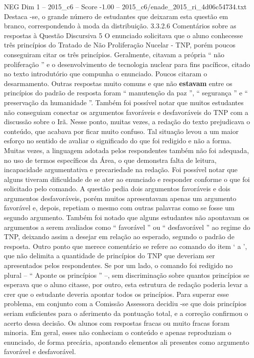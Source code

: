\begin{textsample}{NEG Dim 1 – 2015\_c6 – Score -1.00 – 2015\_c6/enade\_2015\_ri\_4d06c54734.txt}
Destaca -se, o grande número de estudantes que deixaram esta questão em branco, correspondendo à moda da distribuição. 3.3.2.6 Comentários sobre as respostas à Questão Discursiva 5 O enunciado solicitava que o aluno conhecesse três princípios do Tratado de Não Proliferação Nucelar - TNP, porém poucos conseguiram citar os três princípios.
Geralmente, citavam a própria “ não proliferação ” e o desenvolvimento de tecnologia nuclear para fins pacíficos, citado no texto introdutório que compunha o enunciado.
Poucos citaram o desarmamento.
Outras respostas muito comuns e que não \textbf{estavam} entre os princípios do padrão de resposta foram “ manutenção da paz ”, “ segurança ” e “ preservação da humanidade ”.
Também foi possível notar que muitos estudantes não conseguiam conectar os argumentos favoráveis e desfavoráveis do TNP com a discussão sobre o Irã.
Nesse ponto, muitas vezes, a redação do texto prejudicava o conteúdo, que acabava por ficar muito confuso.
Tal situação levou a um maior esforço no sentido de avaliar o significado do que foi redigido e não a forma.
Muitas vezes, a linguagem adotada pelos respondentes também não foi adequada, no uso de termos específicos da Área, o que demonstra falta de leitura, incapacidade argumentativa e precariedade na redação.
Foi possível notar que alguns tiveram dificuldade de se ater ao enunciado e responder conforme o que foi solicitado pelo comando.
A questão pedia dois argumentos favoráveis e dois argumentos desfavoráveis, porém muitos apresentavam apenas um argumento favorável e, depois, repetiam o mesmo com outras palavras como se fosse um segundo argumento.
Também foi notado que alguns estudantes não apontavam os argumentos a serem avaliados como “ favorável ” ou “ desfavorável ” ao regime do TNP, deixando assim a desejar em relação ao esperado, segundo o padrão de resposta.
Outro ponto que merece comentário se refere ao comando do item ‘ a ’, que não delimita a quantidade de princípios do TNP que deveriam ser apresentados pelos respondentes.
Se por um lado, o comando foi redigido no plural – “ Aponte os princípios ” –, sem discriminação sobre quantos princípios se esperava que o aluno citasse, por outro, esta estrutura de redação poderia levar a crer que o estudante deveria apontar todos os princípios.
Para superar esse problema, em conjunto com a Comissão Assessora decidiu -se que dois princípios seriam suficientes para o aferimento da pontuação total, e a correção confirmou o acerto dessa decisão.
Os alunos com respostas fracas ou muito fracas foram minoria.
Em geral, esses não conheciam o conteúdo e apenas reproduziam o enunciado, de forma precária, apontando elementos ali presentes como argumento favorável e desfavorável.

\end{textsample}
